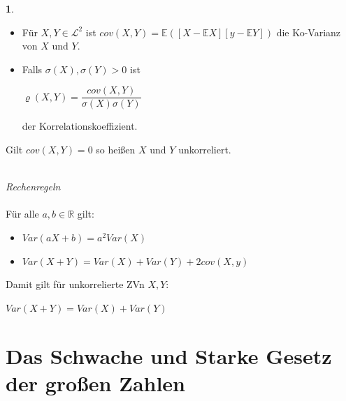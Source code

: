 \documentclass[10pt,a4paper]{report}
\numberwithin{equation}{section}
\numberwithin{figure}{section}
\theoremstyle{plain}
\theoremstyle{definition}
\newtheorem{defn}{\protect\definitionname}[section]
\theoremstyle{plain}
\theoremstyle{definition}
\theoremstyle{remark}
\theoremstyle{plain}
\theoremstyle{plain}
\theoremstyle{plain}
\theoremstyle{plain}
\theoremstyle{plain}
\providecommand{\definitionname}{Definition}
\newcommand{\1}{ \mathbb{1} } %
\begin{document}
\begin{defn}
  \begin{itemize}
  \item Für $X,Y \in \mathcal{L}^2$ ist
    $cov(X,Y)=\mathbb{E}([X-\mathbb{E}X][y-\mathbb{E}Y])$ die
    Ko-Varianz von $X$ und $Y$.
  \item Falls $\sigma(X), \sigma(Y)>0$ ist
    \begin{center}
      $\varrho(X,Y)=\dfrac{cov(X,Y)}{\sigma(X)\sigma(Y)}$
    \end{center}
    der Korrelationskoeffizient.
  \end{itemize}
  Gilt $cov(X,Y)=0$ so heißen $X$ und $Y$ unkorreliert.\\\\
\end{defn}
\textit{Rechenregeln}\\\\
Für alle $a,b \in \mathbb{R}$ gilt:
\begin{itemize}
\item $Var(aX+b)=a^2Var(X)$
\item $Var(X+Y)=Var(X)+Var(Y)+2cov(X,y)$
\end{itemize}
Damit gilt für unkorrelierte ZVn $X,Y$:
\begin{center}
$Var(X+Y)=Var(X)+Var(Y)$
\end{center} 
\section{Das Schwache und Starke Gesetz der großen Zahlen}
\label{sec:gesetz-grosser-zahlen}
\end{document}
